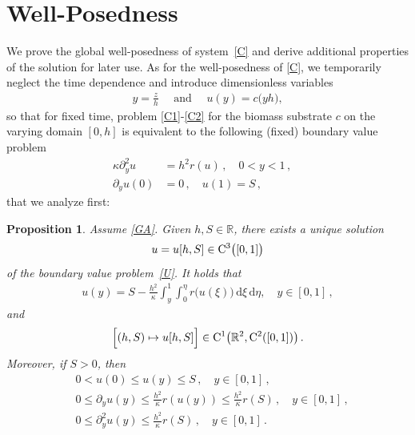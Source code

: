 \documentclass[reqno,11pt]{amsart}
\newtheorem{prop}[thm]{Proposition}
\numberwithin{equation}{section}
\newcommand{\R}{\mathbb{R}}
\newcommand{\rd}{\mathrm{d}}
\begin{document}
\section{Well-Posedness}\label{Sec2}

We prove the global well-posedness of system~\eqref{C} and derive additional properties of the solution for later use. As for the well-posedness of \eqref{C}, we temporarily neglect the time dependence and introduce dimensionless variables
\begin{align}\label{dvar}
y=\frac{z}{h}\quad \text{ and }\quad u(y)=c\bigl(yh\bigr),
\end{align}
so that for fixed time,  problem \eqref{C1}-\eqref{C2} for the biomass substrate $c$ on the varying domain $[0,h]$ is equivalent to the
following (fixed) boundary value problem
\begin{subequations}
\label{U}
\begin{align}
\kappa \partial_{y}^2u&= h^2r(u)\,, \quad 0<y<1\,,\quad \label{BBB2}\\
\partial_{y}u(0)&=0\,,\quad u(1)=S\,, \label{BBB4}
\end{align}
\end{subequations}
that we analyze first: 

\begin{prop}\label{P1}
Assume \eqref{GA}. Given $h,S\in\R$, there exists a
unique solution $$u=u[h,S]\in {\rm C}^3 \bigl( [0,1]\bigr)$$ of the
boundary value problem~\eqref{U}.
It holds that
\begin{align}\label{u}
  u(y)=S-\frac{h^2}{\kappa}
  \int_y^1\int_0^\eta r \bigl( u(\xi)\bigr)\,\rd\xi \,\rd \eta,\quad y\in [0,1]\,,
\end{align}
and
$$
\Bigl[ (h,S)\mapsto u[h,S]\Bigr]\in {\rm C}^1\big(\R^2,
{\rm C}^2([0,1])\big)\, .
$$
Moreover, if $S>0$, then 
\begin{subequations}\label{ccc}
\begin{align}
&0< u(0)\le u(y)\le S\,,\quad  y\in [0,1]\,,\label{ccc1}\\
&0\le \partial_y u(y)\le \frac{h^2}{\kappa}r(u(y))\le \frac{h^2}{\kappa}r(S)\,,\quad 
y\in [0,1]\,,\label{ccc2}\\
&0\le \partial_{y}^2u(y)\le \frac{h^2}{\kappa}r(S)\,,\quad  y\in [0,1]\,. \label{ccc3}
\end{align}
\end{subequations}
\end{prop}
\end{document}
